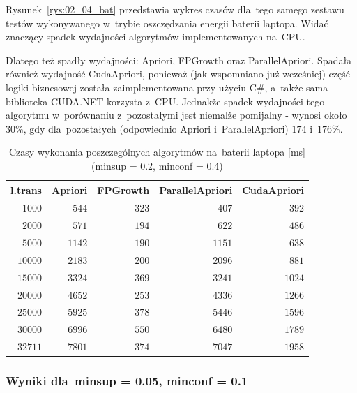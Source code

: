 Rysunek~\ref{rys:02_04_bat} przedstawia wykres czasów dla~tego samego zestawu testów wykonywanego w~trybie oszczędzania energii baterii laptopa. Widać znaczący spadek wydajności algorytmów implementowanych na~CPU.

Dlatego też spadły wydajności: Apriori, FPGrowth oraz ParallelApriori. Spadała również wydajność CudaApriori, ponieważ (jak wspomniano już wcześniej) część logiki biznesowej została zaimplementowana przy użyciu C\#, a~także sama biblioteka CUDA.NET korzysta z~CPU. Jednakże spadek wydajności tego algorytmu w~porównaniu z~pozostałymi jest niemalże pomijalny - wynosi około $30\%$, gdy dla~pozostałych (odpowiednio Apriori i~ParallelApriori) $174$ i~$176\%$.

\begin{table}
	\centering
	\begin{tabular}{r|r|r|r|r}
	\textbf{l.trans} & \textbf{Apriori} & \textbf{FPGrowth} & \textbf{ParallelApriori} & \textbf{CudaApriori}  \\ \hline
	$1000$ & $544$ & $323$ & $407$ & $392$ \\
	$2000$ & $571$ & $194$ & $622$ & $486$ \\
	$5000$ & $1142$ & $190$ & $1151$ & $638$ \\
	$10000$ & $2183$ & $200$ & $2096$ & $881$ \\
	$15000$ & $3324$ & $369$ & $3241$ & $1024$ \\
	$20000$ & $4652$ & $253$ & $4336$ & $1266$ \\
	$25000$ & $5925$ & $378$ & $5446$ & $1596$ \\
	$30000$ & $6996$ & $550$ & $6480$ & $1789$ \\
	$32711$ & $7801$ & $374$ & $7047$ & $1958$ \\
	\end{tabular}
	\caption{Czasy wykonania poszczególnych algorytmów na~baterii laptopa [ms] (minsup = 0.2, minconf = 0.4)\label{tab:02_04_bat}}
\end{table}
\subsubsection{Wyniki dla~minsup = 0.05, minconf = 0.1}


